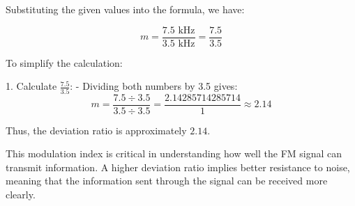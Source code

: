 Substituting the given values into the formula, we have:

\[
m = \frac{7.5 \text{ kHz}}{3.5 \text{ kHz}} = \frac{7.5}{3.5}
\]

To simplify the calculation:

1. Calculate \( \frac{7.5}{3.5} \):
   - Dividing both numbers by 3.5 gives:
   \[
   m = \frac{7.5 \div 3.5}{3.5 \div 3.5} = \frac{2.14285714285714}{1} \approx 2.14
   \]

Thus, the deviation ratio is approximately \(2.14\).

This modulation index is critical in understanding how well the FM signal can transmit information. A higher deviation ratio implies better resistance to noise, meaning that the information sent through the signal can be received more clearly.

